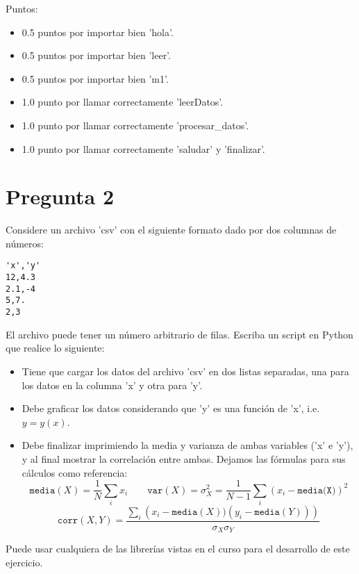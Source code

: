 \documentclass{article}
\begin{document}
Puntos: 
\begin{itemize}
    \item 0.5 puntos por importar bien 'hola'.
    \item 0.5 puntos por importar bien 'leer'.
    \item 0.5 puntos por importar bien 'm1'.
    \item 1.0 punto por llamar correctamente 'leerDatos'.
    \item 1.0 punto por llamar correctamente 'procesar\_datos'.
    \item 1.0 punto por llamar correctamente 'saludar' y 'finalizar'.
\end{itemize}
\section*{Pregunta 2}
Considere un archivo 'csv' con el siguiente formato dado por dos columnas de números:
    \begin{verbatim}
'x','y'
12,4.3
2.1,-4
5,7.
2,3
    \end{verbatim}
El archivo puede tener un número arbitrario de filas. Escriba un script en Python que realice lo siguiente:
    \begin{itemize}
        \item Tiene que cargar los datos del archivo 'csv' en dos listas separadas, una para los datos en la columna 'x' y otra para 'y'.
        \item Debe graficar los datos considerando que 'y' es una función de 'x', i.e. $y=y(x)$.
        \item Debe finalizar imprimiendo la media y varianza de ambas variables ('x' e 'y'), y al final mostrar la correlación entre ambas. Dejamos las fórmulas para sus cálculos como referencia: 
            $$ \texttt{media}(X) = \frac 1 N \sum_i x_i \qquad \texttt{var}(X) = \sigma_X^2 = \frac{1}{N-1}\sum_i(x_i-\texttt{media(X)})^2$$
            $$\texttt{corr}(X,Y) = \frac{\sum_i\left(x_i - \texttt{media}(X))(y_i - \texttt{media}(Y))\right)}{\sigma_X\sigma_Y} $$
    \end{itemize}
Puede usar cualquiera de las librerías vistas en el curso para el desarrollo de este ejercicio.
\end{document}
